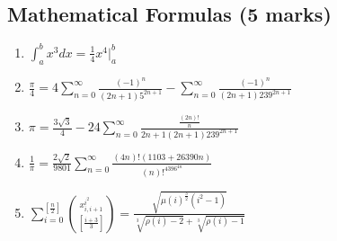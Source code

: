 \documentclass[a4paper,11pt]{article}
\begin{document}
\subsection {\textbf{Mathematical Formulas (5 marks)}}
%
\begin{enumerate}[]%
\item $ \int_a ^b x^3 dx = \frac{1}{4}x^4\Big\rvert_a ^b $
\item $ \frac{\pi}{4} =  4\sum\limits_{n=0}^{\infty} \frac{(-1)^n}{(2n+1)5^{2n+1}}  -  \sum\limits_{n=0}^{\infty} \frac{(-1)^n}{(2n+1)239^{2n+1}} $
\item $ \pi = \frac{3\sqrt{3}}{4} -24\sum\limits_{n=0}^{\infty} \frac{\frac{(2n)!}{n}}{2n+1(2n+1)239^{2n+1}} $
\item $\frac{1}{\pi} = \frac{2\sqrt{2}}{9801}\sum\limits_{n=0}^{\infty}\frac{(4n)!(1103 + 26390n)}{(n)!^4396^{4n}} $
\item $\sum_{i=0}^{[\frac{n}{2}]} \binom{x^{i^2}_{i,i+1}}{[\frac{i+3}{3}]} = \frac{\sqrt{\mu(i)^{\frac{3}{2}}(i^2 - 1)}}{\sqrt[3]{\rho(i)-2}+\sqrt[3]{\rho(i)-1}}$
\end{enumerate}
\pagebreak
\end{document}
